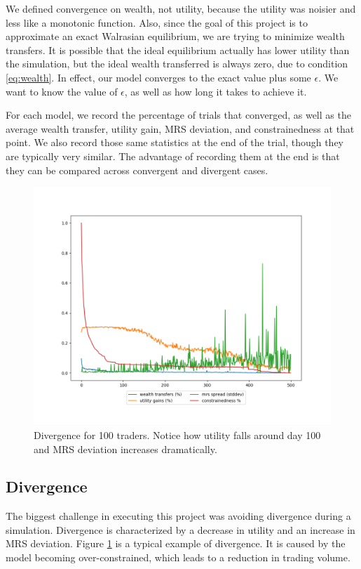 \documentclass[12pt,a4paper,titlepage]{article}
\begin{document}
We defined convergence on wealth, not utility, because the utility was noisier and less like a monotonic function.
Also, since the goal of this project is to approximate an exact Walrasian equilibrium, we are trying to minimize wealth transfers.
It is possible that the ideal equilibrium actually has lower utility than the simulation, but the ideal wealth transferred is always zero, due to condition \ref{eq:wealth}.
In effect, our model converges to the exact value plus some $\epsilon$.
We want to know the value of $\epsilon$, as well as how long it takes to achieve it.

For each model, we record the percentage of trials that converged, as well as the average wealth transfer, utility gain, MRS deviation, and constrainedness at that point.
We also record those same statistics at the end of the trial, though they are typically very similar.
The advantage of recording them at the end is that they can be compared across convergent and divergent cases.

\begin{figure}[H]
    \centering
    \includegraphics[width=\textwidth]{seed_0.png}
    \caption{
      Divergence for 100 traders.
      Notice how utility falls around day 100 and MRS deviation increases dramatically.
    }
    \label{fig:div}
\end{figure}

\subsection{Divergence}
The biggest challenge in executing this project was avoiding divergence during a simulation.
Divergence is characterized by a decrease in utility and an increase in MRS deviation.
Figure \ref{fig:div} is a typical example of divergence. 
It is caused by the model becoming over-constrained, which leads to a reduction in trading volume.
\end{document}
